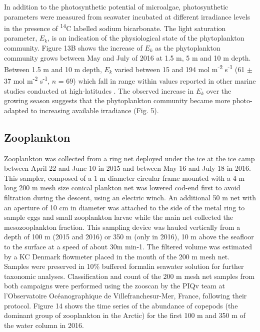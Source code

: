 \documentclass[essd, manuscript]{copernicus}
\begin{document}
In addition to the photosynthetic potential of microalgae, photosynthetic parameters were measured from seawater incubated at different irradiance levels in the presence of \textsuperscript{14}C labelled sodium bicarbonate. The light saturation parameter, $E_k$, is an indication of the physiological state of the phytoplankton community. Figure 13B shows the increase of $E_k$ as the phytoplankton community grows between May and July of 2016 at 1.5 m, 5 m and 10 m depth. Between 1.5 m and 10 m depth, $E_k$ varied between 15 and 194 \textmu mol m\textsuperscript{-2} s\textsuperscript{-1} (61 $\pm$ 37 \textmu mol m\textsuperscript{-2} s\textsuperscript{-1}, $n$ = 69) which fall in range within values reported in other marine studies conducted at high-latitudes \citep{Bouman2018, Massicotte2019}. The observed increase in $E_k$ over the growing season suggests that the phytoplankton community became more photo-adapted to increasing available irradiance (Fig. 5). 

\subsection{Zooplankton}

Zooplankton was collected from a ring net deployed under the ice at the ice camp between April 22 and June 10 in 2015 and between May 16 and July 18 in 2016. This sampler, composed of a 1 m diameter circular frame mounted with a 4 m long 200 \textmu m mesh size conical plankton net was lowered cod-end first to avoid filtration during the descent, using an electric winch. An additional 50 \textmu m net with an aperture of 10 cm in diameter was attached to the side of the metal ring to sample eggs and small zooplankton larvae while the main net collected the mesozooplankton fraction. This sampling device was hauled vertically from a depth of 100 m (2015 and 2016) or 350 m (only in 2016), 10 m above the seafloor to the surface at a speed of about 30m min-1. The filtered volume was estimated by a KC Denmark flowmeter placed in the mouth of the 200 \textmu m mesh net. Samples were preserved in 10\% buffered formalin seawater solution for further taxonomic analyses. Classification and count of the 200 \textmu m mesh net samples from both campaigns were performed using the zooscan by the PIQv team at l’Observatoire Océanographique de Villefranchesur-Mer, France, following their protocol. Figure 14 shows the time series of the abundance of copepods (the dominant group of zooplankton in the Arctic) for the first 100 m and 350 m of the water column in 2016.
\end{document}
